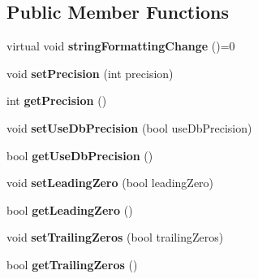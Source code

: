 \subsection*{Public Member Functions}
\begin{DoxyCompactItemize}
\item 
\hypertarget{classQEStringFormattingMethods_aaa18108e4f736eeceadae1940e6360b6}{
virtual void {\bfseries stringFormattingChange} ()=0}
\label{classQEStringFormattingMethods_aaa18108e4f736eeceadae1940e6360b6}

\item 
\hypertarget{classQEStringFormattingMethods_a6a8efcdaf06ec352e6d4c6267d21b7e0}{
void {\bfseries setPrecision} (int precision)}
\label{classQEStringFormattingMethods_a6a8efcdaf06ec352e6d4c6267d21b7e0}

\item 
\hypertarget{classQEStringFormattingMethods_a1ff0d0f685c95da41cf48c8eb561fa56}{
int {\bfseries getPrecision} ()}
\label{classQEStringFormattingMethods_a1ff0d0f685c95da41cf48c8eb561fa56}

\item 
\hypertarget{classQEStringFormattingMethods_a25840c71b2db36b5ea758239ec671376}{
void {\bfseries setUseDbPrecision} (bool useDbPrecision)}
\label{classQEStringFormattingMethods_a25840c71b2db36b5ea758239ec671376}

\item 
\hypertarget{classQEStringFormattingMethods_a1c7e684cc767c4a7cd3a789b3b630d5a}{
bool {\bfseries getUseDbPrecision} ()}
\label{classQEStringFormattingMethods_a1c7e684cc767c4a7cd3a789b3b630d5a}

\item 
\hypertarget{classQEStringFormattingMethods_ad6fe3a15208dcf133bf4169b12647586}{
void {\bfseries setLeadingZero} (bool leadingZero)}
\label{classQEStringFormattingMethods_ad6fe3a15208dcf133bf4169b12647586}

\item 
\hypertarget{classQEStringFormattingMethods_ad7fa6cac15e890770c9d10fa51a730a8}{
bool {\bfseries getLeadingZero} ()}
\label{classQEStringFormattingMethods_ad7fa6cac15e890770c9d10fa51a730a8}

\item 
\hypertarget{classQEStringFormattingMethods_a6e8f4677c1a41a1641ab645a4cfddc7c}{
void {\bfseries setTrailingZeros} (bool trailingZeros)}
\label{classQEStringFormattingMethods_a6e8f4677c1a41a1641ab645a4cfddc7c}

\item 
\hypertarget{classQEStringFormattingMethods_acbc16e21de5c2915b666dbd6e8ba2794}{
bool {\bfseries getTrailingZeros} ()}
\label{classQEStringFormattingMethods_acbc16e21de5c2915b666dbd6e8ba2794}


\end{DoxyCompactItemize}
